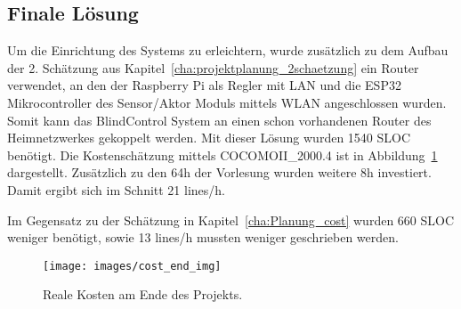 \subsection{Finale Lösung}
Um die Einrichtung des Systems zu erleichtern, wurde zusätzlich zu dem Aufbau der 2. Schätzung aus Kapitel~\ref{cha:projektplanung_2schaetzung} ein Router verwendet, an den der Raspberry Pi als Regler mit LAN und die ESP32 Mikrocontroller des Sensor/Aktor Moduls mittels WLAN angeschlossen wurden. Somit kann das BlindControl System an einen schon vorhandenen Router des Heimnetzwerkes gekoppelt werden. Mit dieser Lösung wurden 1540 SLOC benötigt. Die Kostenschätzung mittels COCOMOII\_2000.4 ist in Abbildung~\ref{fig:cost_end} dargestellt. Zusätzlich zu den 64h der Vorlesung wurden weitere 8h investiert. Damit ergibt sich im Schnitt 21 lines/h. 

Im Gegensatz zu der Schätzung in Kapitel~\ref{cha:Planung_cost} wurden 660 SLOC weniger benötigt, sowie 13 lines/h mussten weniger geschrieben werden.

\begin{figure}[hbt]
	\centering
	\texttt{[image: images/cost\_end\_img]}
	\caption[Kosten Realität]{Reale Kosten am Ende des Projekts.}
	\label{fig:cost_end}
\end{figure}